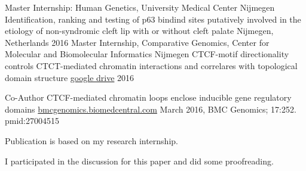 

\begin{cventries}

  \cventry
    {Master Internship: Human Genetics, University Medical Center Nijmegen} %
    {Identification, ranking and testing of p63 bindind sites putatively involved in the etiology of non-syndromic cleft lip with or without cleft palate} %
    {Nijmegen, Netherlands} %
    {2016} %
    {}
  \cventry
    {Master Internship, Comparative Genomics,  Center for Molecular and Biomolecular Informatics Nijmegen} %
    {CTCF-motif directionality controls CTCT-mediated chromatin interactions and correlares with topological domain structure} %
    {\href{https://drive.google.com/file/d/1fE28UxBNoNXvjtaJWrduGhyCLluwIuqX/view?usp=sharing}{google drive}} %
    {2016} %
    {}

  \cventry
    {Co-Author}
    {CTCF-mediated chromatin loops enclose inducible gene regulatory domains} %
    {\href{https://www.ncbi.nlm.nih.gov/pmc/articles/PMC4804521/pdf/12864_2016_Article_2516.pdf}{bmcgenomics.biomedcentral.com}}
    {March 2016, BMC Genomics; 17:252. pmid:27004515} %
    {
      \begin{cvitems}
        \item {Publication is based on my research internship.}
        \item {I participated in the discussion for this paper and did some proofreading.}
      \end{cvitems}
    }
\end{cventries}
